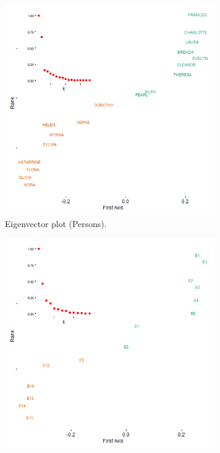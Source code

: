 \documentclass[a4paper,fleqn]{cas-sc}
\begin{document}
\begin{figure}
    \captionsetup[subfigure]{font=footnotesize,labelfont=footnotesize}
    \centering
     \begin{subfigure}[b]{0.45\textwidth}
        \includegraphics[width=1.0\textwidth]{Plots/p-ca-eigvec.png}
            \caption{Eigenvector plot (Persons).}
            \label{fig:ca-reord}
    \end{subfigure}
     \begin{subfigure}[b]{0.45\textwidth}
        \includegraphics[width=1.0\textwidth]{Plots/g-ca-eigvec.png}

\end{subfigure}
\end{figure}
\end{document}
